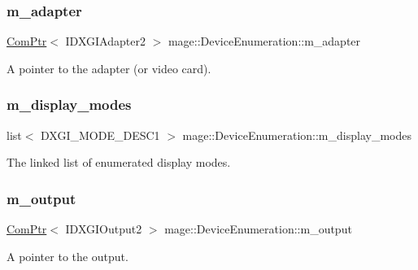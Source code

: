 \subsubsection{\texorpdfstring{m\+\_\+adapter}{m\_adapter}}
{\footnotesize\ttfamily \hyperlink{namespacemage_ae74f374780900893caa5555d1031fd79}{Com\+Ptr}$<$ I\+D\+X\+G\+I\+Adapter2 $>$ mage\+::\+Device\+Enumeration\+::m\+\_\+adapter\hspace{0.3cm}{\ttfamily [private]}}

A pointer to the adapter (or video card). \hypertarget{classmage_1_1_device_enumeration_aae356ac476a35ce4074f61cfd75ecdbe}{}\label{classmage_1_1_device_enumeration_aae356ac476a35ce4074f61cfd75ecdbe} 
\subsubsection{\texorpdfstring{m\+\_\+display\+\_\+modes}{m\_display\_modes}}
{\footnotesize\ttfamily list$<$ D\+X\+G\+I\+\_\+\+M\+O\+D\+E\+\_\+\+D\+E\+S\+C1 $>$ mage\+::\+Device\+Enumeration\+::m\+\_\+display\+\_\+modes\hspace{0.3cm}{\ttfamily [private]}}

The linked list of enumerated display modes. \hypertarget{classmage_1_1_device_enumeration_a49580b67748053ed6172d6458b5083ca}{}\label{classmage_1_1_device_enumeration_a49580b67748053ed6172d6458b5083ca} 
\subsubsection{\texorpdfstring{m\+\_\+output}{m\_output}}
{\footnotesize\ttfamily \hyperlink{namespacemage_ae74f374780900893caa5555d1031fd79}{Com\+Ptr}$<$ I\+D\+X\+G\+I\+Output2 $>$ mage\+::\+Device\+Enumeration\+::m\+\_\+output\hspace{0.3cm}{\ttfamily [private]}}

A pointer to the output. \hypertarget{classmage_1_1_device_enumeration_a74b32839bda6446db56aaf4b6dd25f20}{}\label{classmage_1_1_device_enumeration_a74b32839bda6446db56aaf4b6dd25f20} 
